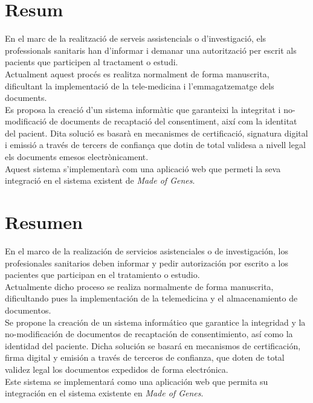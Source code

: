 \chapter*{Resum}

En el marc de la realització de serveis assistencials o d'investigació, els professionals sanitaris han d'informar i demanar una autorització per escrit als pacients que participen al tractament o estudi.\\ 
\newline Actualment aquest procés es realitza normalment de forma manuscrita, dificultant la implementació de la tele-medicina i l’emmagatzematge dels documents.\\
\newline Es proposa la creació d'un sistema informàtic que garanteixi la integritat i no-modificació de documents de recaptació del consentiment, així com la identitat del pacient. Dita solució es basarà en mecanismes de certificació, signatura digital i emissió a través de tercers de confiança que dotin de total validesa a nivell legal els documents emesos electrònicament.\\
\newline Aquest sistema s’implementarà com una aplicació web que permeti la seva integració en el sistema existent de \textit{Made of Genes}.
\clearpage
\chapter*{Resumen}
En el marco de la realización de servicios asistenciales o de investigación, los profesionales sanitarios deben informar y pedir autorización por escrito a los pacientes que participan en el tratamiento o estudio.\\
\newline Actualmente dicho proceso se realiza normalmente de forma manuscrita, dificultando pues la implementación de la telemedicina y el almacenamiento de documentos.\\
\newline Se propone la creación de un sistema informático que garantice la integridad y la no-modificación de documentos de recaptación de consentimiento, así como la identidad del paciente. Dicha solución se basará en mecanismos de certificación, firma digital y emisión a través de terceros de confianza, que doten de total validez legal los documentos expedidos de forma electrónica.\\
\newline Este sistema se implementará como una aplicación web que permita su integración en el sistema existente en \textit{Made of Genes}.
\clearpage
